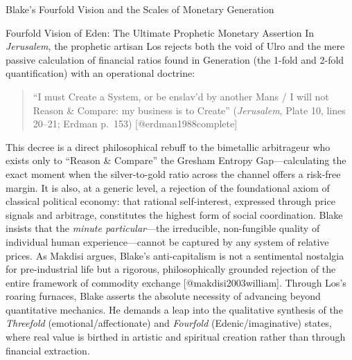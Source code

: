 \documentclass[
  ignorenonframetext,
]{beamer}
\begin{document}
\begin{frame}{Blake's Fourfold Vision and the Scales of Monetary
Generation}
\begin{block}{Fourfold Vision of Eden: The Ultimate Prophetic Monetary
Assertion}
\protect{}\label{fourfold-vision-of-eden-the-ultimate-prophetic-monetary-assertion}
In \emph{Jerusalem}, the prophetic artisan Los rejects both the void of
Ulro and the mere passive calculation of financial ratios found in
Generation (the 1-fold and 2-fold quantification) with an operational
doctrine:

\begin{quote}
``I must Create a System, or be enslav'd by another Mans / I will not
Reason \& Compare: my business is to Create'' (\emph{Jerusalem}, Plate
10, lines 20--21; Erdman p.~153) {[}@erdman1988complete{]}
\end{quote}

This decree is a direct philosophical rebuff to the bimetallic
arbitrageur who exists only to ``Reason \& Compare'' the Gresham Entropy
Gap---calculating the exact moment when the silver-to-gold ratio across
the channel offers a risk-free margin. It is also, at a generic level, a
rejection of the foundational axiom of classical political economy: that
rational self-interest, expressed through price signals and arbitrage,
constitutes the highest form of social coordination. Blake insists that
the \emph{minute particular}---the irreducible, non-fungible quality of
individual human experience---cannot be captured by any system of
relative prices. As Makdisi argues, Blake's anti-capitalism is not a
sentimental nostalgia for pre-industrial life but a rigorous,
philosophically grounded rejection of the entire framework of commodity
exchange {[}@makdisi2003william{]}. Through Los's roaring furnaces,
Blake asserts the absolute necessity of advancing beyond quantitative
mechanics. He demands a leap into the qualitative synthesis of the
\emph{Threefold} (emotional/affectionate) and \emph{Fourfold}
(Edenic/imaginative) states, where real value is birthed in artistic and
spiritual creation rather than through financial extraction.


\end{block}
\end{frame}
\end{document}
